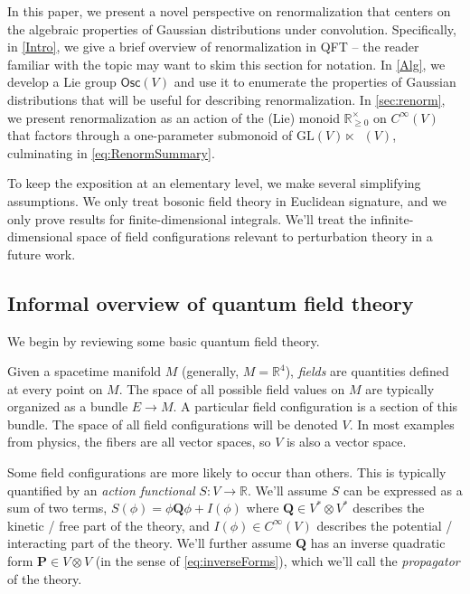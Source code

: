 \documentclass[12pt]{article}
\theoremstyle{definition}
\theoremstyle{plain}
\newcommand{\Symp}{\mathop{\mathrm{Sym}_2^+}}
\begin{document}
In this paper, we present a novel perspective on renormalization that centers on the algebraic properties of Gaussian distributions under convolution. 
Specifically, in \autoref{Intro}, we give a brief overview of renormalization in QFT -- the reader familiar with the topic may want to skim this section for notation.
In \autoref{Alg}, we develop a Lie group $\mathsf{Osc}(V)$ and use it to enumerate the properties of Gaussian distributions that will be useful for describing renormalization.
In \autoref{sec:renorm}, we present renormalization as an action of the (Lie) monoid $\mathbb{R}^\times_{\geq 0}$ on $C^\infty(V)$ that factors through a one-parameter submonoid of $\mathrm{GL}(V)\ltimes \Symp(V)$, culminating in \autoref{eq:RenormSummary}.

To keep the exposition at an elementary level, we make several simplifying assumptions.  We only treat bosonic field theory in Euclidean signature, and we only prove results for finite-dimensional integrals. We'll treat the infinite-dimensional space of field configurations relevant to perturbation theory in a future work.

\subsection{Informal overview of quantum field theory}

We begin by reviewing some basic quantum field theory. 

Given a spacetime manifold $M$ (generally, $M=\mathbb{R}^4$), \textit{fields} are quantities defined at every point on $M$.  The space of all possible field values on $M$ are typically organized as a bundle $E\to M$.  A particular field configuration is a section of this bundle. The space of all field configurations will be denoted $V$.  In most examples from physics, the fibers are all vector spaces, so \(V\) is also a vector space. 

Some field configurations are more likely to occur than others. This is typically quantified by an \textit{action functional} $S: V \to \mathbb{R}$. We'll assume $S$ can be expressed as a sum of two terms, $S(\phi) = \phi \mathbf{Q}\phi + I(\phi)$ where $\mathbf{Q}\in V^*\otimes V^*$ describes the kinetic / free part of the theory, and $I(\phi)\in C^\infty(V)$ describes the potential / interacting part of the theory. We'll further assume $\mathbf{Q}$ has an inverse quadratic form $\mathbf{P}\in V\otimes V$ (in the sense of \autoref{eq:inverseForms}), which we'll call the \emph{propagator} of the theory.
\end{document}
